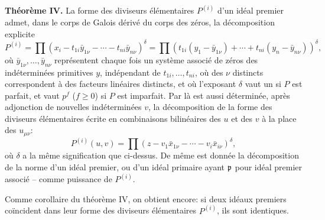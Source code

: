 \textbf{Théorème IV.} La forme des diviseurs élémentaires $P^{(i)}$ d'un idéal premier admet, dans le corps de Galois dérivé du corps des zéros, la décomposition explicite
\[
 P^{(i)}=\prod (x_i-t_{1i}\bar y_{1\nu}-\cdots-t_{ni}\bar y_{n\nu})^\delta
 =\prod (t_{1i}(y_1-\bar y_{1\nu})+\cdots+t_{ni}(y_n-\bar y_{n\nu}))^\delta,
\]
où $\bar y_{1\nu},\ldots,\bar y_{n\nu}$ représentent chaque fois un système associé de zéros des indéterminées primitives $y$, indépendant de $t_{1i},\ldots,t_{ni}$, où des $\nu$ distincts correspondent à des facteurs linéaires distincts, et où l'exposant $\delta$ vaut un si $P$ est parfait, et vaut $p^f$ ($f\ge0$) si $P$ est imparfait. Par là est aussi déterminée, après adjonction de nouvelles indéterminées $v$, la décomposition de la forme des diviseurs élémentaires écrite en combinaisons bilinéaires des $u$ et des $v$ à la place des $u_{\mu\nu}$:
\[
 P^{(i)}(u,v)=\prod (z-v_1\bar x_{1\nu}-\cdots-v_i\bar x_{i\nu})^\delta,
\]
où $\delta$ a la même signification que ci-dessus. De même est donnée la décomposition de la norme d'un idéal premier, ou d'un idéal primaire ayant $\mathfrak p$ pour idéal premier associé -- comme puissance de $P^{(i)}$.

Comme corollaire du théorème IV, on obtient encore: si deux idéaux premiers coïncident dans leur forme des diviseurs élémentaires $P^{(i)}$, ils sont identiques.

